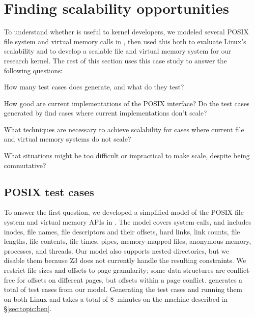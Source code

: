 \section{Finding scalability opportunities}
\label{sec:fs}

\cbstart To understand whether \tool{} is useful to kernel developers,
we modeled several POSIX file system and virtual memory calls in \tool,
then used this both to evaluate Linux's scalability and to develop a
scalable file and virtual memory system for our \sys research kernel. \cbend
%
The rest of this section uses this case study to answer the following
questions:

\begin{CompactItemize}

\item How many test cases does \tool{} generate, and what do they test?

\item How good are current implementations of the POSIX interface?
      Do the test cases generated by \tool{} find
      cases where current implementations don't scale?

\item What techniques are necessary to achieve scalability for
      cases where current file and virtual memory systems do not
      scale?

\item What situations might be too difficult or impractical to
      make scale, despite being commutative?

\end{CompactItemize}

\subsection{POSIX test cases}

\cbstart
To answer the first question, we developed a simplified model of the
POSIX file system and virtual memory APIs in \tool{}.  The model covers
 system
calls, and includes inodes, file
names, file descriptors and their offsets, hard links, link counts,
file lengths, file contents, file times, pipes, memory-mapped files,
anonymous memory, processes, and threads.  Our model
also supports nested
directories, but we disable them because Z3 does not currently handle
the resulting constraints.
%
We restrict file sizes and offsets to page granularity; some \sys data
structures are conflict-free for offsets on different pages, but
offsets within a page conflict.
%
\tool generates a total of  test cases
from our model.
%
Generating the test cases and running them on both Linux and \sys
takes a total of 8~minutes on the machine described in
\S\ref{sec:topic:ben}.

